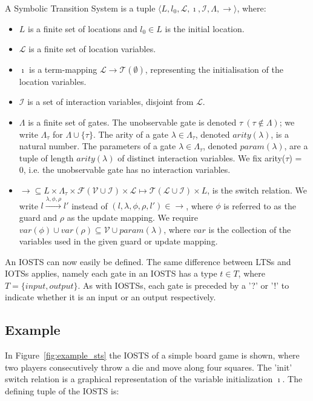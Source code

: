 \begin{definition}
A Symbolic Transition System is a tuple $\langle L,l_0,\mathcal{L},\imath,\mathcal{I},\Lambda,\rightarrow\rangle$, where:
\begin{itemize}
\item $L$ is a finite set of locations and $l_0 \in L$ is the initial location.
\item $\mathcal{L}$ is a finite set of location variables.
\item $\imath$ is a term-mapping $\mathcal{L} \rightarrow \mathcal{T}(\emptyset)$, representing the initialisation of the location variables.
\item $\mathcal{I}$ is a set of interaction variables, disjoint from $\mathcal{L}$.
\item $\Lambda$ is a finite set of gates. The unobservable gate is denoted $\tau~(\tau \notin \Lambda)$; we write $\Lambda_\tau$ for $\Lambda \cup \{\tau\}$. The arity of a gate $\lambda\in\Lambda_\tau$, denoted $arity(\lambda)$, is a natural number. The parameters of a gate $\lambda\in\Lambda_\tau$, denoted $param(\lambda)$, are a tuple of length $arity(\lambda)$ of distinct interaction variables. We fix arity($\tau$) = 0, i.e. the unobservable gate has no interaction variables.
\item $\rightarrow \subseteq L \times \Lambda_\tau \times \mathcal{F}(\mathcal{V} \cup \mathcal{I}) \times \mathcal{L} \mapsto \mathcal{T}(\mathcal{L} \cup \mathcal{I}) \times L$, is the switch relation. We write $l\xrightarrow{\lambda,\phi,\rho}l'$ instead of $(l,\lambda,\phi,\rho,l')\in\rightarrow$, where $\phi$ is referred to as the guard and $\rho$ as the update mapping. We require $var(\phi) \cup var(\rho) \subseteq \mathcal{V} \cup param(\lambda)$, where $var$ is the collection of the variables used in the given guard or update mapping.
\end{itemize}
\end{definition}

An IOSTS can now easily be defined. The same difference between LTSs and IOTSs applies, namely each gate in an IOSTS has a type $t \in T$, where $T = \{input, output\}$. As with IOSTSs, each gate is preceded by a '?' or '!' to indicate whether it is an input or an output respectively.

\subsection{Example}\label{sec:sts_example}
In Figure~\ref{fig:example_sts} the IOSTS of a simple board game is shown, where two players consecutively throw a die and move along four squares. The 'init' switch relation is a graphical representation of the variable initialization $\imath$. The defining tuple of the IOSTS is:


